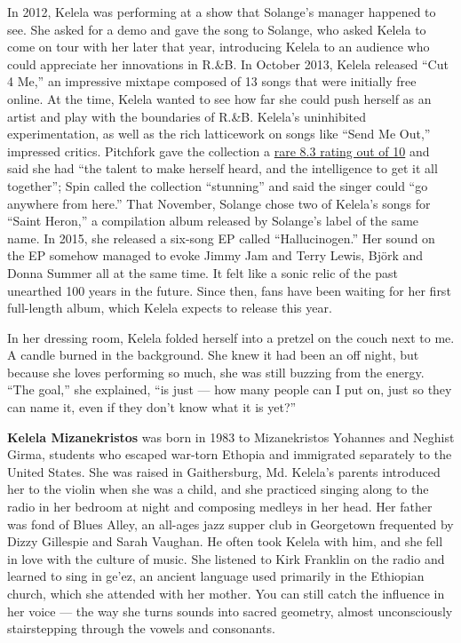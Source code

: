 In 2012, Kelela was performing at a show that Solange's manager happened
to see. She asked for a demo and gave the song to Solange, who asked
Kelela to come on tour with her later that year, introducing Kelela to
an audience who could appreciate her innovations in R.\&B. In October
2013, Kelela released ``Cut 4 Me,'' an impressive mixtape composed of 13
songs that were initially free online. At the time, Kelela wanted to see
how far she could push herself as an artist and play with the boundaries
of R.\&B. Kelela's uninhibited experimentation, as well as the rich
latticework on songs like ``Send Me Out,'' impressed critics. Pitchfork
gave the collection a
\href{http://pitchfork.com/reviews/albums/18661-kelela-cut-4-me/}{rare
8.3 rating out of 10} and said she had ``the talent to make herself
heard, and the intelligence to get it all together''; Spin called the
collection ``stunning'' and said the singer could ``go anywhere from
here.'' That November, Solange chose two of Kelela's songs for ``Saint
Heron,'' a compilation album released by Solange's label of the same
name. In 2015, she released a six-song EP called ``Hallucinogen.'' Her
sound on the EP somehow managed to evoke Jimmy Jam and Terry Lewis,
Björk and Donna Summer all at the same time. It felt like a sonic relic
of the past unearthed 100 years in the future. Since then, fans have
been waiting for her first full-length album, which Kelela expects to
release this year.

In her dressing room, Kelela folded herself into a pretzel on the couch
next to me. A candle burned in the background. She knew it had been an
off night, but because she loves performing so much, she was still
buzzing from the energy. ``The goal,'' she explained, ``is just --- how
many people can I put on, just so they can name it, even if they don't
know what it is yet?''

\textbf{Kelela Mizanekristos} was born in 1983 to Mizanekristos Yohannes
and Neghist Girma, students who escaped war-torn Ethopia and immigrated
separately to the United States. She was raised in Gaithersburg, Md.
Kelela's parents introduced her to the violin when she was a child, and
she practiced singing along to the radio in her bedroom at night and
composing medleys in her head. Her father was fond of Blues Alley, an
all-ages jazz supper club in Georgetown frequented by Dizzy Gillespie
and Sarah Vaughan. He often took Kelela with him, and she fell in love
with the culture of music. She listened to Kirk Franklin on the radio
and learned to sing in ge'ez, an ancient language used primarily in the
Ethiopian church, which she attended with her mother. You can still
catch the influence in her voice --- the way she turns sounds into
sacred geometry, almost unconsciously stairstepping through the vowels
and consonants.

